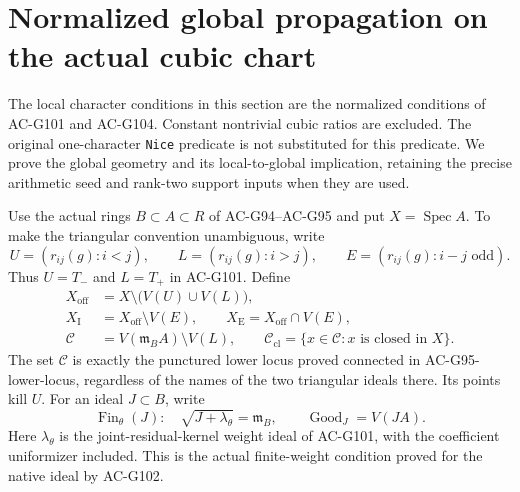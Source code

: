 \section{Normalized global propagation on the actual cubic chart}
\label{sec:cubic-normalized-global-propagation}

The local character conditions in this section are the normalized
conditions of AC-G101 and AC-G104.  Constant nontrivial cubic ratios
are excluded.  The original one-character \texttt{Nice} predicate is
not substituted for this predicate.  We prove the global geometry and
its local-to-global implication, retaining the precise arithmetic
seed and rank-two support inputs when they are used.

Use the actual rings $B\subset A\subset R$ of AC-G94--AC-G95 and
put $X=\operatorname{Spec}A$.  To make the triangular convention
unambiguous, write
\[
 U=(r_{ij}(g):i<j),\qquad L=(r_{ij}(g):i>j),\qquad
 E=(r_{ij}(g):i-j\text{ odd}).
 \tag{G108.1}
\]
Thus $U=T_-$ and $L=T_+$ in AC-G101.  Define
\[
 \begin{split}
 X_{\mathrm{off}}&=X\setminus\bigl(V(U)\cup V(L)\bigr),\\
 X_{\mathrm I}&=X_{\mathrm{off}}\setminus V(E),\qquad
 X_{\mathrm E}=X_{\mathrm{off}}\cap V(E),\\
 \mathcal C&=V(\mathfrak m_BA)\setminus V(L),\qquad
 \mathcal C_{\mathrm{cl}}=\{x\in\mathcal C:x\text{ is closed in }X\}.
 \end{split}
 \tag{G108.2}
\]
The set $\mathcal C$ is exactly the punctured lower locus proved
connected in AC-G95-lower-locus, regardless of the names of the two
triangular ideals there.  Its points kill $U$.
For an ideal $J\subset B$, write
\[
 \operatorname{Fin}_{\theta}(J):\quad
 \sqrt{J+\lambda_{\theta}}=\mathfrak m_B,
 \qquad \operatorname{Good}_J=V(JA).
 \tag{G108.3}
\]
Here $\lambda_{\theta}$ is the joint-residual-kernel weight ideal
of AC-G101, with the coefficient uniformizer included.  This is the
actual finite-weight condition proved for the native ideal by AC-G102.

